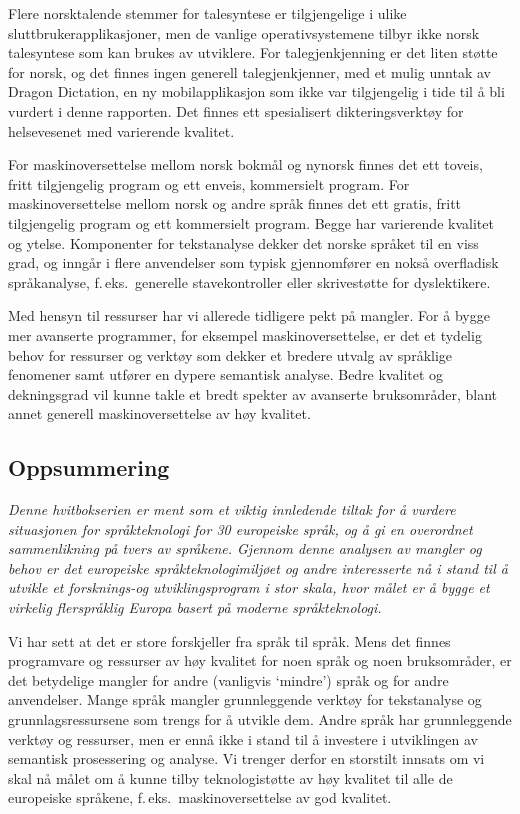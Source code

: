 \begin{multicols}{2}
Flere norsktalende stemmer for talesyntese er tilgjengelige i ulike sluttbrukerapplikasjoner, men de vanlige operativsystemene tilbyr ikke norsk talesyntese som kan brukes av utviklere. 
For talegjenkjenning er det liten støtte for norsk, og det finnes ingen generell talegjenkjenner, med et mulig unntak av Dragon Dictation, en ny mobilapplikasjon som ikke var tilgjengelig i tide til å bli vurdert i denne rapporten.
Det finnes ett spesialisert dikteringsverktøy for helsevesenet med varierende kvalitet. 

For maskinoversettelse mellom norsk bokmål og nynorsk finnes det ett toveis, fritt tilgjengelig program og ett enveis, kommersielt program. 
For maskinoversettelse mellom norsk og andre språk finnes det ett gratis, fritt tilgjengelig program og ett kommersielt program. Begge har varierende kvalitet og ytelse. Komponenter for tekstanalyse dekker det norske språket til en viss grad, og inngår i flere anvendelser som typisk gjennomfører en nokså overfladisk språkanalyse, f.\,eks.~generelle stavekontroller eller skrivestøtte for dyslektikere. 

Med hensyn til ressurser har vi allerede tidligere pekt på mangler.
For å bygge mer avanserte programmer, for eksempel maskinoversettelse, er det et tydelig behov for ressurser og verktøy som dekker et bredere utvalg av språklige fenomener samt utfører en dypere semantisk analyse. Bedre kvalitet og dekningsgrad vil kunne takle et bredt spekter av avanserte bruksområder, blant annet generell maskinoversettelse av høy kvalitet.

\subsection{Oppsummering}

\emph{Denne hvitbokserien er ment som et viktig innledende tiltak for å vurdere situasjonen for språkteknologi for 30 europeiske språk, og å gi en overordnet sammenlikning på tvers av språkene. Gjennom denne analysen av mangler og behov er det europeiske språkteknologimiljøet og andre interesserte nå i stand til å utvikle et forsknings-og utviklingsprogram i stor skala, hvor målet er å bygge et virkelig flerspråklig Europa basert på moderne språkteknologi.}

Vi har sett at det er store forskjeller fra språk til språk. Mens det finnes programvare og ressurser av høy kvalitet for noen språk og noen bruksområder, er det betydelige mangler for andre (vanligvis `mindre') språk og for andre anvendelser. Mange språk mangler grunnleggende verktøy for tekstanalyse og grunnlagsressursene som trengs for å utvikle dem. Andre språk har grunnleggende verktøy og ressurser, men er ennå ikke i stand til å investere i utviklingen av semantisk prosessering og analyse. Vi trenger derfor en storstilt innsats om vi skal nå målet om å kunne tilby teknologistøtte av høy kvalitet til alle de europeiske språkene, f.\,eks.~maskinoversettelse av god kvalitet.


\end{multicols}
